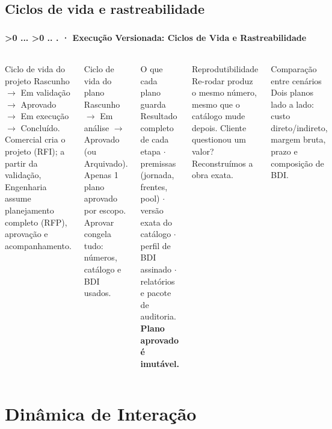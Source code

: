 \documentclass[aspectratio=169,10pt]{beamer}
\newcounter{mlc3}[subsection]
\newcounter{mlc4}[mlc3]
\newcommand{\pathnum}{%
  \ifnum\value{mlc4}>0
    \thesection.\thesubsection.\arabic{mlc3}.\arabic{mlc4}%
  \else\ifnum\value{mlc3}>0
    \thesection.\thesubsection.\arabic{mlc3}%
  \else
    \thesection.\thesubsection%
  \fi\fi
}
\newcommand{\mtitle}[1]{%
  \frametitle{\insertsection}%
  \framesubtitle{\pathnum\;·\; #1}}
\begin{document}
\subsection{Ciclos de vida e rastreabilidade}
\begin{frame}
  \mtitle{Execução Versionada: Ciclos de Vida e Rastreabilidade}
  \begin{columns}[T]
    \begin{block}{Ciclo de vida do projeto}
      \scriptsize Rascunho $\to$ Em validação $\to$ Aprovado $\to$ Em
      execução $\to$ Concluído.\\
      Comercial cria o projeto (RFI); a partir da validação, Engenharia
      assume planejamento completo (RFP), aprovação e acompanhamento.
    \end{block}
    \vspace{4pt}
    \begin{block}{Ciclo de vida do plano}
      \scriptsize Rascunho $\to$ Em análise $\to$ Aprovado (ou
      Arquivado). Apenas 1 plano aprovado por escopo.
      Aprovar congela tudo: números, catálogo e BDI usados.
    \end{block}
    \begin{block}{O que cada plano guarda}
      \scriptsize Resultado completo de cada etapa $\cdot$ premissas
      (jornada, frentes, pool) $\cdot$ versão exata do catálogo $\cdot$
      perfil de BDI assinado $\cdot$ relatórios e pacote de auditoria.\\
      \textbf{Plano aprovado é imutável.}
    \end{block}
    \vspace{4pt}
    \begin{exampleblock}{\small Reprodutibilidade}
      \scriptsize Re-rodar produz o mesmo número, mesmo que o catálogo
      mude depois. Cliente questionou um valor? Reconstruímos a obra
      exata.
    \end{exampleblock}
    \vspace{4pt}
    \begin{block}{Comparação entre cenários}
      \scriptsize Dois planos lado a lado: custo direto/indireto,
      margem bruta, prazo e composição de BDI.
    \end{block}
  \end{columns}
\end{frame}

\section{Dinâmica de Interação}
\end{document}
